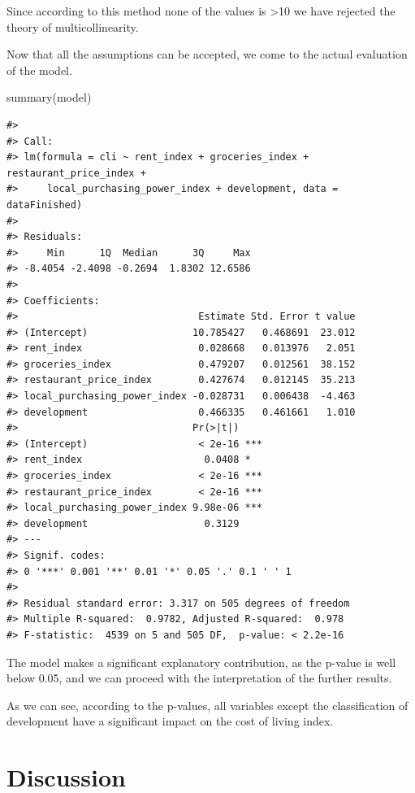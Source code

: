 \documentclass[
  11pt,
  a4paper,
  twoside]{scrbook}
\newenvironment{Shaded}{\begin{snugshade}}{\end{snugshade}}
\newcommand{\FunctionTok}[1]{\textcolor[rgb]{0.00,0.00,0.00}{#1}}
\newcommand{\NormalTok}[1]{#1}
\begin{document}
Since according to this method none of the values is \textgreater10 we have rejected the theory of multicollinearity.

Now that all the assumptions can be accepted, we come to the actual evaluation of the model.

\linespread{1}

\begin{Shaded}
\begin{Highlighting}[]
\FunctionTok{summary}\NormalTok{(model)}
\end{Highlighting}
\end{Shaded}

\linespread{1}

\begin{verbatim}
#> 
#> Call:
#> lm(formula = cli ~ rent_index + groceries_index + restaurant_price_index + 
#>     local_purchasing_power_index + development, data = dataFinished)
#> 
#> Residuals:
#>     Min      1Q  Median      3Q     Max 
#> -8.4054 -2.4098 -0.2694  1.8302 12.6586 
#> 
#> Coefficients:
#>                               Estimate Std. Error t value
#> (Intercept)                  10.785427   0.468691  23.012
#> rent_index                    0.028668   0.013976   2.051
#> groceries_index               0.479207   0.012561  38.152
#> restaurant_price_index        0.427674   0.012145  35.213
#> local_purchasing_power_index -0.028731   0.006438  -4.463
#> development                   0.466335   0.461661   1.010
#>                              Pr(>|t|)    
#> (Intercept)                   < 2e-16 ***
#> rent_index                     0.0408 *  
#> groceries_index               < 2e-16 ***
#> restaurant_price_index        < 2e-16 ***
#> local_purchasing_power_index 9.98e-06 ***
#> development                    0.3129    
#> ---
#> Signif. codes:  
#> 0 '***' 0.001 '**' 0.01 '*' 0.05 '.' 0.1 ' ' 1
#> 
#> Residual standard error: 3.317 on 505 degrees of freedom
#> Multiple R-squared:  0.9782, Adjusted R-squared:  0.978 
#> F-statistic:  4539 on 5 and 505 DF,  p-value: < 2.2e-16
\end{verbatim}

The model makes a significant explanatory contribution, as the p-value is well below 0.05, and we can proceed with the interpretation of the further results.

As we can see, according to the p-values, all variables except the classification of development have a significant impact on the cost of living index.

\hypertarget{discussion}{%
\chapter{Discussion}\label{discussion}}
\end{document}
